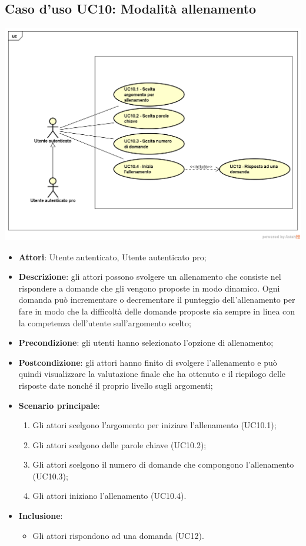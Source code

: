 \subsection{Caso d'uso UC10: Modalità allenamento}
\begin{center}
\includegraphics[scale=0.5]{UML/UC10.png}
\end{center}
\begin{itemize}
\item\textbf{Attori}: Utente autenticato, Utente autenticato pro;
\item\textbf{Descrizione}: gli attori possono svolgere un allenamento che consiste nel rispondere a domande che gli vengono proposte in modo dinamico. Ogni domanda può incrementare o decrementare il punteggio dell'allenamento per fare in modo che la difficoltà delle domande proposte sia sempre in linea con la competenza dell'utente sull'argomento scelto;
\item\textbf{Precondizione}: gli utenti hanno selezionato l'opzione di allenamento;
\item\textbf{Postcondizione}: gli attori hanno finito di svolgere l'allenamento e può quindi visualizzare la valutazione finale che ha ottenuto e il riepilogo delle risposte date nonché il proprio livello sugli argomenti;
\item\textbf{Scenario principale}:
	\begin{enumerate}
		\item Gli attori scelgono l'argomento per iniziare l'allenamento (UC10.1);
		\item Gli attori scelgono delle parole chiave (UC10.2);
		\item Gli attori scelgono il numero di domande che compongono l'allenamento (UC10.3);
		\item Gli attori iniziano l'allenamento (UC10.4).
	\end{enumerate}
\item \textbf{Inclusione}:
	\begin{itemize}
		\item Gli attori rispondono ad una domanda (UC12).
	\end{itemize}
\end{itemize}


